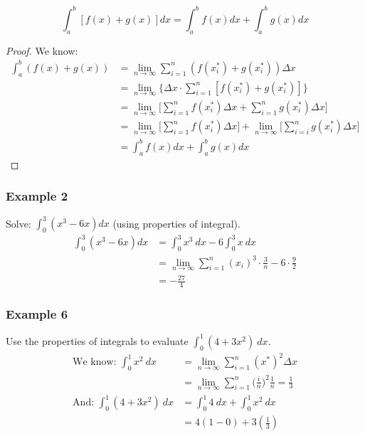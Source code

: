 \documentclass[11pt]{article}
\begin{document}
\pagebreak
\subsection{}
\begin{theo}
    \[
        \int_{a}^{b}[f(x)+g(x)]dx=\int_{a}^{b}f(x)dx+\int_{a}^{b}g(x)dx
    \]
\end{theo}
\begin{proof}
    We know:
    \begin{align*}
        \int_{a}^{b}(f(x)+g(x))&=\lim_{n\to\infty}\sum_{i=1}^{n}(f(x_i^*)+g(x_i^*))\Delta x\\
        &=\lim_{n\to\infty}\Big\{\Delta x \cdot \sum_{i=1}^{n}[f(x_i^*)+g(x_i^*)]\Big\}\\
        &=\lim_{n\to\infty}\Big[\sum_{i=1}^{n}f(x_i^*)\Delta x+\sum_{i=1}^{n}g(x_i^*)\Delta x\Big]\\
        &=\lim_{n\to\infty}\Big[\sum_{i=1}^{n}f(x_i^*)\Delta x\Big]+\lim_{n\to\infty}\Big[\sum_{i=i}^{n}g(x_i^*)\Delta x\Big]\\
        &=\int_{a}^{b}f(x)dx+\int_{a}^{b}g(x)dx
    \end{align*}
\end{proof}
\subsubsection{Example 2}
Solve: $\displaystyle{\int_{0}^{3}(x^3-6x)dx}$ (using properties of integral).
\begin{align*}
    \int_{0}^{3}(x^3-6x)dx &= \int_{0}^{3}x^3\ dx - 6\int_{0}^{3}x\ dx\\
    &= \lim_{n\to\infty}\sum_{i=1}^{n}(x_i)^3\cdot \frac{3}{n} - 6\cdot \frac{9}{2}\\
    &= -\frac{27}{4}
\end{align*}

\subsubsection{Example 6}
Use the properties of integrals to evaluate $\displaystyle{\int_{0}^{1}(4+3x^2)\ dx}$.
\begin{align*}
    \text{We know: }\int_{0}^{1}x^2\ dx &= \lim_{n\to\infty}\sum_{i=1}^{n}(x^*)^2\Delta x\\
    &=\lim_{n\to\infty}\sum_{i=1}^{n}\Big(\frac{i}{n}\Big)^2\frac{1}{n} = \frac{1}{3}\\
    \text{And: }\int_{0}^{1}(4+3x^2)\ dx &= \int_{0}^{1}4\ dx + \int_{0}^{1}x^2\ dx\\
    &= 4(1-0) +3(\frac{1}{3})
\end{align*}
\end{document}
